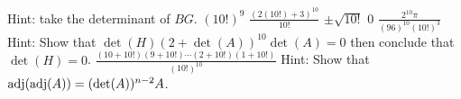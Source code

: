 \begin{Answer}
\begin{multicols}{2}
\Question Hint: take the determinant of $BG$.
\Question $(10!)^9$
\Question $\frac{(2(10!)+3)^{10}}{10!}$
\Question $\pm\sqrt{10!}$
\Question $0$
\Question $\frac{2^{10}\pi}{(96)^{10}(10!)^3}$
\Question Hint: Show that $\det(H)(2+\det(A))^{10}\det(A)=0$ then conclude that $\det(H)=0$.
\Question $\frac{(10+10!)(9+10!)\cdots(2+10!)(1+10!)}{(10!)^{10}}$
\Question Hint: Show that $\operatorname{adj}(\operatorname{adj}(A))=(\det(A))^{n-2}A$.
\EndCurrentQuestion
\end{multicols}
\end{Answer}
